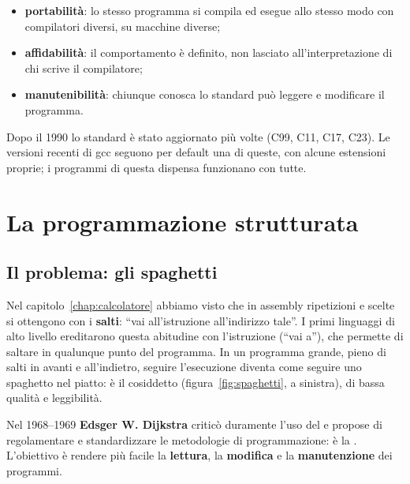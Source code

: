 \begin{itemize}
  \item \textbf{portabilità}: lo stesso programma si compila ed esegue allo
        stesso modo con compilatori diversi, su macchine diverse;
  \item \textbf{affidabilità}: il comportamento è definito, non lasciato
        all'interpretazione di chi scrive il compilatore;
  \item \textbf{manutenibilità}: chiunque conosca lo standard può leggere e
        modificare il programma.
\end{itemize}

Dopo il 1990 lo standard è stato aggiornato più volte (C99, C11, C17, C23).
Le versioni recenti di gcc seguono per default una di queste, con alcune
estensioni proprie; i programmi di questa dispensa funzionano con tutte.

\section{La programmazione strutturata}

\subsection{Il problema: gli spaghetti}

Nel capitolo~\ref{chap:calcolatore} abbiamo visto che in assembly
ripetizioni e scelte si ottengono con i \textbf{salti}: “vai
all'istruzione all'indirizzo tale”. I primi linguaggi di alto livello
ereditarono questa abitudine con l'istruzione  (“vai a”), che
permette di saltare in qualunque punto del programma. In un programma
grande, pieno di salti in avanti e all'indietro, seguire l'esecuzione
diventa come seguire uno spaghetto nel piatto: è il cosiddetto
 (figura~\ref{fig:spaghetti}, a sinistra), di bassa
qualità e leggibilità.

Nel 1968--1969 \textbf{Edsger W. Dijkstra} criticò duramente l'uso del
 e propose di regolamentare e standardizzare le metodologie di
programmazione: è la . L'obiettivo è
rendere più facile la \textbf{lettura}, la \textbf{modifica} e la
\textbf{manutenzione} dei programmi.

